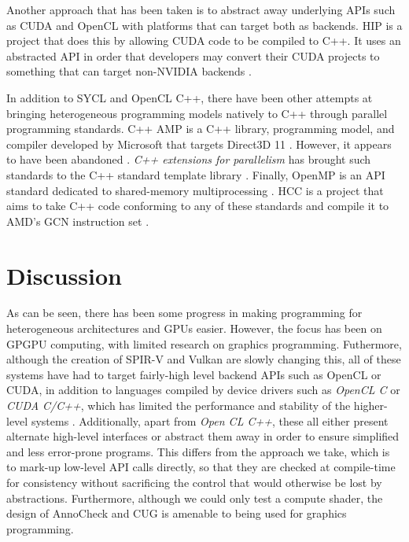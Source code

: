 \documentclass[a4paper,12pt,twoside,openright]{report}
\begin{document}
Another approach that has been taken is to abstract away underlying APIs such
as CUDA and OpenCL with platforms that can target both as backends. HIP is a
project that does this by allowing CUDA code to be compiled to C++. It uses an
abstracted API in order that developers may convert their CUDA projects to
something that can target non-NVIDIA backends \cite{HIP}.

In addition to SYCL and OpenCL C++, there have been other attempts at bringing
heterogeneous programming models natively to C++ through parallel programming
standards. C++ AMP is a C++ library, programming model, and compiler developed
by Microsoft that targets Direct3D 11 \cite{CAMP}. However, it appears to have
been abandoned \cite{CAMPFail1} \cite{CAMPFail2}. \textit{C++ extensions for
parallelism} has brought such standards to the C++ standard template library
\cite{CPPParallelism}. Finally, OpenMP is an API standard dedicated to
shared-memory multiprocessing \cite{OpenMP}. HCC is a project that aims to take
C++ code conforming to any of these standards and compile it to AMD's GCN
instruction set \cite{HCC}.

\section{Discussion}

As can be seen, there has been some progress in making programming for
heterogeneous architectures and GPUs easier. However, the focus has been on
GPGPU computing, with limited research on graphics programming. Futhermore,
although the creation of SPIR-V and Vulkan are slowly changing this, all of
these systems have had to target fairly-high level backend APIs such as OpenCL
or CUDA, in addition to languages compiled by device drivers such as
\textit{OpenCL C} or \textit{CUDA C/C++}, which has limited the performance and
stability of the higher-level systems \cite{GLFuzz}. Additionally, apart from
\textit{Open CL C++}, these all either present alternate high-level interfaces
or abstract them away in order to ensure simplified and less error-prone
programs. This differs from the approach we take, which is to mark-up low-level
API calls directly, so that they are checked at compile-time for consistency
without sacrificing the control that would otherwise be lost by abstractions.
Furthermore, although we could only test a compute shader, the design of
AnnoCheck and CUG is amenable to being used for graphics programming.

\end{document}
